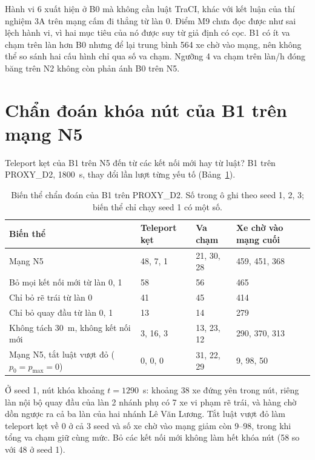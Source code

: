 \documentclass[../main.tex]{subfiles}
\begin{document}
Hành vi 6 xuất hiện ở B0 mà không cần luật TraCI, khác với kết luận của thí nghiệm 3A trên mạng cấm đi thẳng từ làn 0. Điểm M9 chưa đọc được như sai lệch hành vi, vì hai mục tiêu của nó được suy từ giả định có cọc. B1 có ít va chạm trên làn hơn B0 nhưng để lại trung bình 564 xe chờ vào mạng, nên không thể so sánh hai cấu hình chỉ qua số va chạm. Ngưỡng 4 va chạm trên làn/h đóng băng trên N2 không còn phản ánh B0 trên N5.

\section{Chẩn đoán khóa nút của B1 trên mạng N5}
\label{subsection:gridlock}

Teleport kẹt của B1 trên N5 đến từ các kết nối mới hay từ luật? B1 trên PROXY\_D2, 1800~s, thay đổi lần lượt từng yếu tố (Bảng~\ref{table:4.gridlock}).

\begin{table}[!htbp]
\centering
\small
\caption{Biến thể chẩn đoán của B1 trên PROXY\_D2. Số trong ô ghi theo seed 1, 2, 3; biến thể chỉ chạy seed 1 có một số.} \label{table:4.gridlock}
\begin{tabular}{|>{\raggedright\arraybackslash}p{6.4cm}|p{2.2cm}|p{2.2cm}|p{2.4cm}|}
\hline
\textbf{Biến thể} & \textbf{Teleport kẹt} & \textbf{Va chạm} & \textbf{Xe chờ vào mạng cuối} \\ \hline
Mạng N5 & 48, 7, 1 & 21, 30, 28 & 459, 451, 368 \\ \hline
Bỏ mọi kết nối mới từ làn 0, 1 & 58 & 56 & 465 \\ \hline
Chỉ bỏ rẽ trái từ làn 0 & 41 & 45 & 414 \\ \hline
Chỉ bỏ quay đầu từ làn 0, 1 & 13 & 14 & 279 \\ \hline
Không tách 30~m, không kết nối mới & 3, 16, 3 & 13, 23, 12 & 290, 370, 313 \\ \hline
Mạng N5, tắt luật vượt đỏ ($p_0 = p_{\max} = 0$) & 0, 0, 0 & 31, 22, 29 & 9, 98, 50 \\ \hline
\end{tabular}
\end{table}

Ở seed 1, nút khóa khoảng $t = 1290$~s: khoảng 38 xe đứng yên trong nút, riêng làn nội bộ quay đầu của làn 2 nhánh phụ có 7 xe vi phạm rẽ trái, và hàng chờ dồn ngược ra cả ba làn của hai nhánh Lê Văn Lương. Tắt luật vượt đỏ làm teleport kẹt về 0 ở cả 3 seed và số xe chờ vào mạng giảm còn 9--98, trong khi tổng va chạm giữ cùng mức. Bỏ các kết nối mới không làm hết khóa nút (58 so với 48 ở seed 1).
\end{document}
